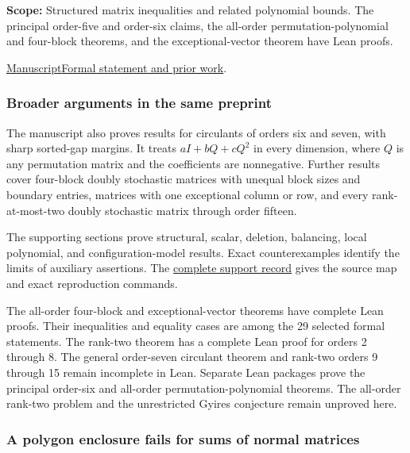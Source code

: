 \documentclass[11pt,a4paper]{article}
\begin{document}
\noindent\textbf{Scope:} Structured matrix inequalities and related polynomial bounds. The principal order-five and order-six claims, the all-order permutation-polynomial and four-block theorems, and the exceptional-vector theorem have Lean proofs.

\par\smallskip

\noindent\href{https://github.com/dvgyl/math-and-theory/blob/main/papers/mathematics/gyires/paper.pdf}{Manuscript}\quad\href{https://github.com/dvgyl/math-and-theory/blob/main/lean/docs/mathematics/gyires.md}{Formal statement and prior work}.

\subsubsection*{Broader arguments in the same preprint}

The manuscript also proves results for circulants of orders six and seven, with sharp sorted-gap margins. It treats $aI+bQ+cQ^2$ in every dimension, where $Q$ is any permutation matrix and the coefficients are nonnegative. Further results cover four-block doubly stochastic matrices with unequal block sizes and boundary entries, matrices with one exceptional column or row, and every rank-at-most-two doubly stochastic matrix through order fifteen.

The supporting sections prove structural, scalar, deletion, balancing, local polynomial, and configuration-model results. Exact counterexamples identify the limits of auxiliary assertions. The \href{https://github.com/dvgyl/math-and-theory/blob/main/papers/mathematics/gyires/research-notes/complete-support/README.md}{complete support record} gives the source map and exact reproduction commands.

The all-order four-block and exceptional-vector theorems have complete Lean proofs. Their inequalities and equality cases are among the 29 selected formal statements. The rank-two theorem has a complete Lean proof for orders 2 through 8. The general order-seven circulant theorem and rank-two orders 9 through 15 remain incomplete in Lean. Separate Lean packages prove the principal order-six and all-order permutation-polynomial theorems. The all-order rank-two problem and the unrestricted Gyires conjecture remain unproved here.

\subsubsection{A polygon enclosure fails for sums of normal matrices}
\end{document}
